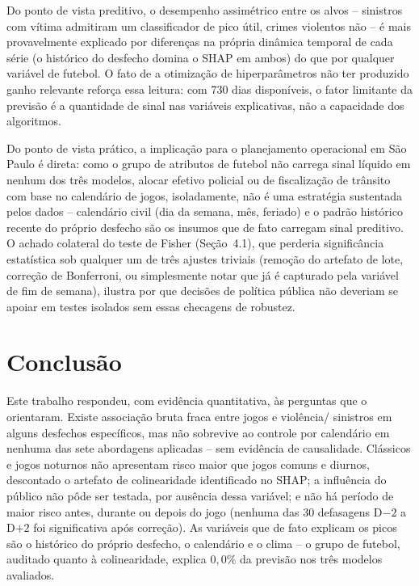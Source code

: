 \documentclass[12pt]{article}
\begin{document}
Do ponto de vista preditivo, o desempenho assimétrico entre os alvos --
sinistros com vítima admitiram um classificador de pico útil, crimes
violentos não -- é mais provavelmente explicado por diferenças na própria
dinâmica temporal de cada série (o histórico do desfecho domina o SHAP em
ambos) do que por qualquer variável de futebol. O fato de a otimização de
hiperparâmetros não ter produzido ganho relevante reforça essa leitura:
com 730 dias disponíveis, o fator limitante da previsão é a quantidade de
sinal nas variáveis explicativas, não a capacidade dos algoritmos.

Do ponto de vista prático, a implicação para o planejamento operacional
em São Paulo é direta: como o grupo de atributos de futebol não carrega
sinal líquido em nenhum dos três modelos, alocar efetivo policial ou de
fiscalização de trânsito com base no calendário de jogos, isoladamente,
não é uma estratégia sustentada pelos dados -- calendário civil (dia da
semana, mês, feriado) e o padrão histórico recente do próprio desfecho são
os insumos que de fato carregam sinal preditivo. O achado colateral do
teste de Fisher (Seção~4.1), que perderia significância estatística sob
qualquer um de três ajustes triviais (remoção do artefato de lote,
correção de Bonferroni, ou simplesmente notar que já é capturado pela
variável de fim de semana), ilustra por que decisões de política pública
não deveriam se apoiar em testes isolados sem essas checagens de
robustez.

\section{Conclusão}

Este trabalho respondeu, com evidência quantitativa, às perguntas que o
orientaram. Existe associação bruta fraca entre jogos e violência/
sinistros em alguns desfechos específicos, mas não sobrevive ao controle
por calendário em nenhuma das sete abordagens aplicadas -- sem evidência
de causalidade. Clássicos e jogos noturnos não apresentam risco maior que
jogos comuns e diurnos, descontado o artefato de colinearidade
identificado no SHAP; a influência do público não pôde ser testada, por
ausência dessa variável; e não há período de maior risco antes, durante
ou depois do jogo (nenhuma das 30 defasagens D$-2$ a D$+2$ foi
significativa após correção). As variáveis que de fato explicam os picos
são o histórico do próprio desfecho, o calendário e o clima -- o grupo de
futebol, auditado quanto à colinearidade, explica $0,0\%$ da previsão nos
três modelos avaliados.
\end{document}
